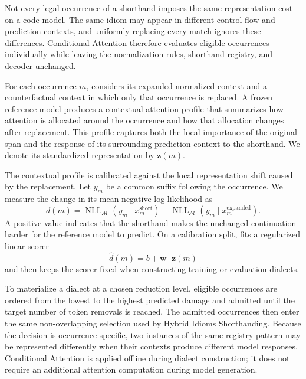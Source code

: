 Not every legal occurrence of a shorthand imposes the same representation cost on a code model. The same idiom may appear in different control-flow and prediction contexts, and uniformly replacing every match ignores these differences. Conditional Attention therefore evaluates eligible occurrences individually while leaving the normalization rules, shorthand registry, and decoder unchanged.

For each occurrence $m$, \tool considers its expanded normalized context and a counterfactual context in which only that occurrence is replaced. A frozen reference model produces a contextual attention profile that summarizes how attention is allocated around the occurrence and how that allocation changes after replacement. This profile captures both the local importance of the original span and the response of its surrounding prediction context to the shorthand. We denote its standardized representation by $\mathbf{z}(m)$.

The contextual profile is calibrated against the local representation shift caused by the replacement. Let $y_m$ be a common suffix following the occurrence. We measure the change in its mean negative log-likelihood as
\begin{equation}
    d(m)=\operatorname{NLL}_{\mathcal{M}}(y_m\mid x_m^{\mathrm{short}})
         -\operatorname{NLL}_{\mathcal{M}}(y_m\mid x_m^{\mathrm{expanded}}).
\end{equation}
A positive value indicates that the shorthand makes the unchanged continuation harder for the reference model to predict. On a calibration split, \tool fits a regularized linear scorer
\begin{equation}
    \widehat d(m)=b+\mathbf{w}^{\top}\mathbf{z}(m)
\end{equation}
and then keeps the scorer fixed when constructing training or evaluation dialects.

To materialize a dialect at a chosen reduction level, eligible occurrences are ordered from the lowest to the highest predicted damage and admitted until the target number of token removals is reached. The admitted occurrences then enter the same non-overlapping selection used by Hybrid Idioms Shorthanding. Because the decision is occurrence-specific, two instances of the same registry pattern may be represented differently when their contexts produce different model responses. Conditional Attention is applied offline during dialect construction; it does not require an additional attention computation during model generation.

